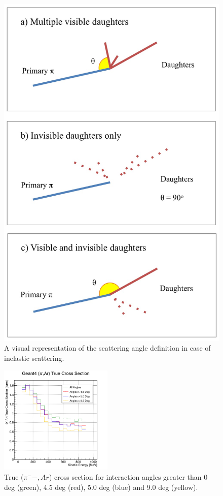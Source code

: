 \begin{figure}[ht]
\begin{minipage}[t]{0.45\linewidth}
\includegraphics[width=\textwidth]{Chapter-5/Images/Daughters.png}
\caption{A visual representation of the scattering angle definition in case of inelastic scattering.}
\label{fig:scatterPic}
\end{minipage}
\end{figure}

\begin{figure}[p]
\centering
\includegraphics[width=0.48\textwidth]{Chapter-5/Images/cTrueXSAngle.png}
\caption{ True ($\pi^-{-}, Ar$) cross section for interaction angles greater than 0 deg (green), 4.5 deg (red), 5.0 deg  (blue) and 9.0 deg (yellow). }
\label{fig:trueWithAngles}
\end{figure}





